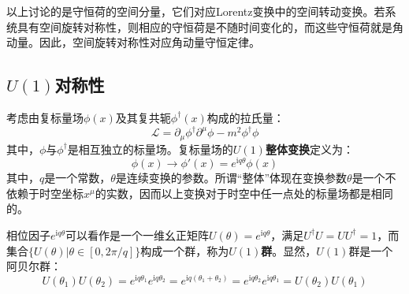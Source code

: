 \documentclass{book}
\begin{document}
以上讨论的是守恒荷的空间分量，它们对应Lorentz变换中的空间转动变换。若系统具有空间旋转对称性，则相应的守恒荷是不随时间变化的，而这些守恒荷就是角动量。因此，空间旋转对称性对应角动量守恒定律。
\subsection{$U(1)$对称性}
考虑由复标量场$\phi(x)$及其复共轭$\phi^\dagger(x)$构成的拉氏量：
\begin{equation}
	\mathscr{L}=\partial_\mu\phi^\dagger\partial^\mu\phi-m^2\phi^\dagger\phi
	\label{1.123}
\end{equation}
其中，$\phi$与$\phi^\dagger$是相互独立的标量场。复标量场的\textbf{$U(1)$整体变换}定义为：
\begin{equation}
	\phi(x)\to\phi'(x)=e^{\mathrm{i}q\theta}\phi(x)
\end{equation}
其中，$q$是一个常数，$\theta$是连续变换的参数。所谓“整体”体现在变换参数$\theta$是一个不依赖于时空坐标$x^\mu$的实数，因而以上变换对于时空中任一点处的标量场都是相同的。

相位因子$e^{\mathrm{i}q\theta}$可以看作是一个一维幺正矩阵$U(\theta)=e^{\mathrm{i}q\theta}$，满足$U^\dagger U=UU^\dagger=1$，而集合$\{U(\theta)|\theta\in[0,2\pi/q]\}$构成一个群，称为\textbf{$U(1)$群}。显然，$U(1)$群是一个阿贝尔群：
\begin{equation}
	U(\theta_1)U(\theta_2)=e^{\mathrm{i}q\theta_1}e^{\mathrm{i}q\theta_2}=e^{\mathrm{i}q(\theta_1+\theta_2)}=e^{\mathrm{i}q\theta_2}e^{\mathrm{i}q\theta_1}=U(\theta_2)U(\theta_1)
\end{equation}
\end{document}
